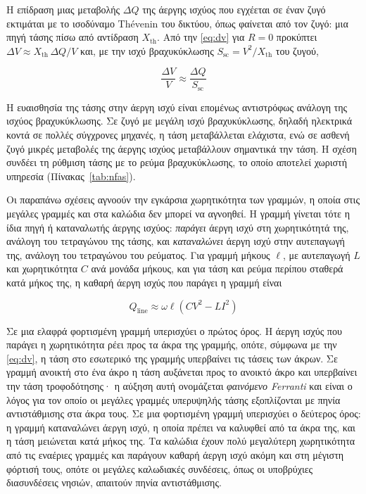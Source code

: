 Η επίδραση μιας μεταβολής $\Delta Q$ της άεργης ισχύος που εγχέεται σε έναν ζυγό εκτιμάται με
το ισοδύναμο Thévenin του δικτύου, όπως φαίνεται από τον ζυγό: μια πηγή τάσης πίσω από
αντίδραση $X_{\mathrm{th}}$. Από την \eqref{eq:dv} για $R = 0$ προκύπτει
$\Delta V \approx X_{\mathrm{th}}\,\Delta Q / V$ και, με την ισχύ βραχυκύκλωσης
$S_{\mathrm{sc}} = V^2 / X_{\mathrm{th}}$ του ζυγού,

\begin{equation}
\frac{\Delta V}{V} \approx \frac{\Delta Q}{S_{\mathrm{sc}}}
\label{eq:dv-ssc}
\end{equation}

Η ευαισθησία της τάσης στην άεργη ισχύ είναι επομένως αντιστρόφως ανάλογη της ισχύος
βραχυκύκλωσης. Σε ζυγό με μεγάλη ισχύ βραχυκύκλωσης, δηλαδή ηλεκτρικά κοντά σε πολλές
σύγχρονες μηχανές, η τάση μεταβάλλεται ελάχιστα, ενώ σε ασθενή ζυγό μικρές μεταβολές της
άεργης ισχύος μεταβάλλουν σημαντικά την τάση. Η σχέση συνδέει τη ρύθμιση τάσης με το ρεύμα
βραχυκύκλωσης, το οποίο αποτελεί χωριστή υπηρεσία (Πίνακας~\ref{tab:nfas}).

Οι παραπάνω σχέσεις αγνοούν την εγκάρσια χωρητικότητα των γραμμών, η οποία στις μεγάλες
γραμμές και στα καλώδια δεν μπορεί να αγνοηθεί. Η γραμμή γίνεται τότε η ίδια πηγή ή καταναλωτής
άεργης ισχύος: \emph{παράγει} άεργη ισχύ στη χωρητικότητά της, ανάλογη του τετραγώνου της
τάσης, και \emph{καταναλώνει} άεργη ισχύ στην αυτεπαγωγή της, ανάλογη του τετραγώνου του
ρεύματος. Για γραμμή μήκους $\ell$, με αυτεπαγωγή $L$ και χωρητικότητα $C$ ανά μονάδα μήκους,
και για τάση και ρεύμα περίπου σταθερά κατά μήκος της, η καθαρή άεργη ισχύς που παράγει η
γραμμή είναι

\begin{equation}
Q_{\mathrm{line}} \approx \omega \ell \left( C V^2 - L I^2 \right)
\label{eq:qline}
\end{equation}

Σε μια ελαφρά φορτισμένη γραμμή υπερισχύει ο πρώτος όρος. Η άεργη ισχύς που παράγει η
χωρητικότητα ρέει προς τα άκρα της γραμμής, οπότε, σύμφωνα με την \eqref{eq:dv}, η τάση στο
εσωτερικό της γραμμής υπερβαίνει τις τάσεις των άκρων. Σε γραμμή ανοικτή στο ένα άκρο η τάση
αυξάνεται προς το ανοικτό άκρο και υπερβαίνει την τάση τροφοδότησης· η αύξηση αυτή ονομάζεται
\emph{φαινόμενο Ferranti} και είναι ο λόγος για τον οποίο οι μεγάλες γραμμές υπερυψηλής τάσης
εξοπλίζονται με πηνία αντιστάθμισης στα άκρα τους. Σε μια φορτισμένη γραμμή υπερισχύει ο
δεύτερος όρος: η γραμμή καταναλώνει άεργη ισχύ, η οποία πρέπει να καλυφθεί από τα άκρα της, και
η τάση μειώνεται κατά μήκος της. Τα καλώδια έχουν πολύ μεγαλύτερη χωρητικότητα από τις εναέριες
γραμμές και παράγουν καθαρή άεργη ισχύ ακόμη και στη μέγιστη φόρτισή τους, οπότε οι μεγάλες
καλωδιακές συνδέσεις, όπως οι υποβρύχιες διασυνδέσεις νησιών, απαιτούν πηνία αντιστάθμισης.


